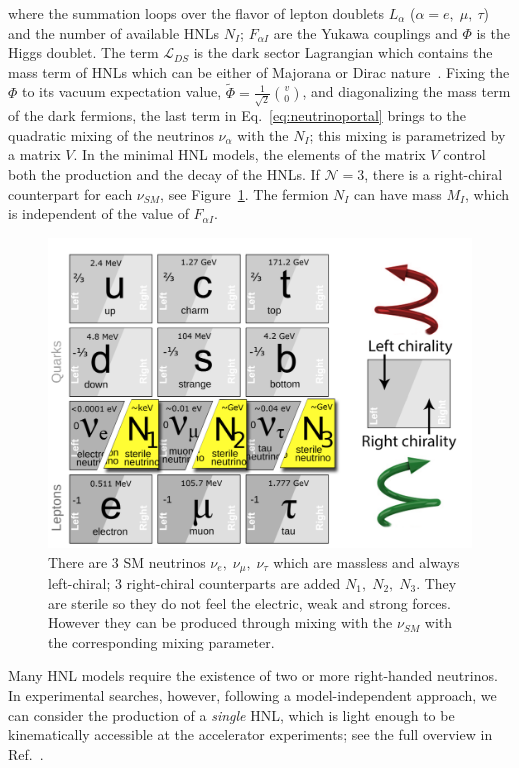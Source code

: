 where the summation loops over the flavor of lepton doublets
${L}_{\alpha}$ ($\alpha = e,\; \mu, \: \tau$) and the number of
available HNLs $N_{I}$; $F_{\alpha I} $ are the Yukawa couplings and
$\Phi$ is the Higgs doublet. The term $\mathcal{L}_{DS}$ is the dark
sector Lagrangian which contains the mass term of HNLs which can be
either of Majorana or Dirac nature~\cite{Alekhin_2016}.
Fixing the $\Phi$ to its vacuum expectation value, $\widetilde \Phi = \frac{1}{\sqrt{2}} \binom{v}{0}$, and diagonalizing the mass term of the dark fermions, the last term in Eq.~\ref{eq:neutrinoportal} brings to the quadratic mixing of the neutrinos $\nu_{\alpha}$ with the $N_{I}$; this mixing is parametrized by a matrix $V$. In the minimal HNL models, the elements of the matrix $V$ control both the production and the decay of the HNLs. 
If $\mathcal{N} = 3$, there is a right-chiral counterpart for each $\nu_{SM}$, see Figure~\ref{fig:c3sm_extension}. The fermion $N_I$ can have mass $M_I$, which is independent  of the value of $F_{\alpha I}$.
\begin{figure}[t!]
  \centering
  \includegraphics[width=.60\textwidth]{Figures/c3/SM_extension}
    \caption{There are 3 SM neutrinos $\nu_{e}, \; \nu_{\mu}, \;\nu_{\tau}$ which are massless and always left-chiral; 3 right-chiral counterparts are added $N_{1}, \; N_{2}, \;N_{3}$. They are sterile so they do not feel the electric, weak and strong forces. However they can be produced through mixing with the $\nu_{SM}$ with the corresponding mixing parameter.}
  \label{fig:c3sm_extension}
\end{figure}

Many HNL models require the existence of two or more right-handed
neutrinos. In experimental searches, however, following a
model-independent approach, we can consider the production of a
\emph{single} HNL, which is light enough to be kinematically
accessible at the accelerator experiments; see the full overview in Ref.~\cite{Atre_2009}. 

